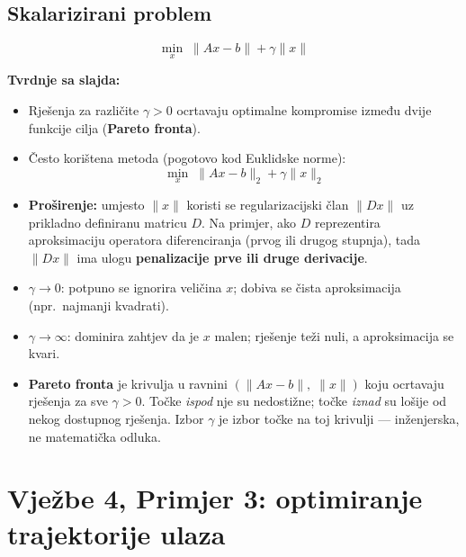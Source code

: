 \subsection{Skalarizirani problem}

\[
\min_x \; \|Ax - b\| + \gamma\|x\|
\]

\textbf{Tvrdnje sa slajda:}

\begin{itemize}
  \item Rješenja za različite $\gamma > 0$ ocrtavaju optimalne kompromise
        između dvije funkcije cilja (\textbf{Pareto fronta}).
  \item Često korištena metoda (pogotovo kod Euklidske norme):
        \[
        \min_x \; \|Ax-b\|_2 + \gamma\|x\|_2
        \]
  \item \textbf{Proširenje:} umjesto $\|x\|$ koristi se regularizacijski član
        $\|Dx\|$ uz prikladno definiranu matricu $D$. Na primjer, ako $D$
        reprezentira aproksimaciju operatora diferenciranja (prvog ili drugog
        stupnja), tada $\|Dx\|$ ima ulogu \textbf{penalizacije prve ili druge
        derivacije}.
\end{itemize}

\begin{napomena}
\begin{itemize}
  \item $\gamma \to 0$: potpuno se ignorira veličina $x$; dobiva se čista
        aproksimacija (npr.\ najmanji kvadrati).
  \item $\gamma \to \infty$: dominira zahtjev da je $x$ malen; rješenje teži
        nuli, a aproksimacija se kvari.
  \item \textbf{Pareto fronta} je krivulja u ravnini
        $(\|Ax-b\|,\; \|x\|)$ koju ocrtavaju rješenja za sve $\gamma > 0$.
        Točke \emph{ispod} nje su nedostižne; točke \emph{iznad} su lošije od
        nekog dostupnog rješenja. Izbor $\gamma$ je izbor točke na toj krivulji
        --- inženjerska, ne matematička odluka.
\end{itemize}
\end{napomena}

\section{Vježbe 4, Primjer 3: optimiranje trajektorije ulaza}

